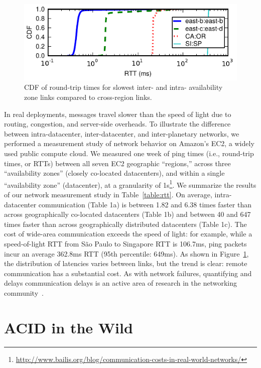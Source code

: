 \begin{figure}[t!]
\includegraphics[width=\columnwidth]{figs/ping-plot.pdf}\vspace{-1em}
\caption{CDF of round-trip times for slowest inter- and intra-
  availability zone links compared to cross-region links.}\vspace{-1em}
\label{fig:rtt}
\end{figure}

In real deployments, messages travel slower than the speed of light
due to routing, congestion, and server-side overheads. To illustrate
the difference between intra-datacenter, inter-datacenter, and
inter-planetary networks, we performed a measurement study of network
behavior on Amazon's EC2, a widely used public compute cloud. We
measured one week of ping times (i.e., round-trip times, or RTTs)
between all seven EC2 geographic ``regions,'' across three
``availability zones'' (closely co-located datacenters), and within a
single ``availability zone'' (datacenter), at a granularity of
1s\footnote{\url{http://www.bailis.org/blog/communication-costs-in-real-world-networks/}}. We
summarize the results of our network measurement study in
Table~\ref{table:rtt}. On average, intra-datacenter communication
(Table 1a) is between 1.82 and 6.38 times faster than across
geographically co-located datacenters (Table 1b) and between 40 and
647 times faster than across geographically distributed datacenters
(Table 1c). The cost of wide-area communication exceeds the speed of
light: for example, while a speed-of-light RTT from S\~{a}o Paulo to
Singapore RTT is 106.7ms, ping packets incur an average 362.8ms RTT
(95th percentile: 649ms). As shown in Figure~\ref{fig:rtt}, the
distribution of latencies varies between links, but the trend is
clear: remote communication has a substantial cost. As with network
failures, quantifying and delays communication delays is an active
area of research in the networking community~\cite{bobtail}.

\section{ACID in the Wild}
\label{sec:modernacid}

